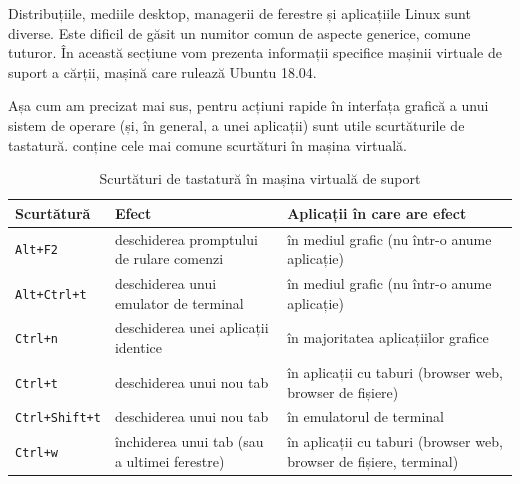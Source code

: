 Distribuțiile, mediile desktop, managerii de ferestre și aplicațiile Linux sunt diverse. Este dificil de găsit un numitor comun de aspecte generice, comune tuturor. În această secțiune vom prezenta informații specifice mașinii virtuale de suport a cărții, mașină care rulează Ubuntu 18.04.

Așa cum am precizat mai sus, pentru acțiuni rapide în interfața grafică a unui sistem de operare (și, în general, a unei aplicații) sunt utile scurtăturile de tastatură.  conține cele mai comune scurtături în mașina virtuală.

\begin{table}[!htb]
  \caption{Scurtături de tastatură în mașina virtuală de suport}
  {\scriptsize
  \begin{center}
    \begin{tabular}{ p{} p{} p{} }
      \toprule
        \textbf{Scurtătură} &
        \textbf{Efect} &
        \textbf{Aplicații în care are efect} \\
      \midrule
        \texttt{Alt+F2} &
        deschiderea promptului de rulare comenzi &
        în mediul grafic (nu într-o anume aplicație) \\
        \midrule

        \texttt{Alt+Ctrl+t} &
        deschiderea unui emulator de terminal &
        în mediul grafic (nu într-o anume aplicație) \\
        \midrule

        \texttt{Ctrl+n} &
        deschiderea unei aplicații identice &
        în majoritatea aplicațiilor grafice \\
        \midrule

        \texttt{Ctrl+t} &
        deschiderea unui nou tab &
        în aplicații cu taburi (browser web, browser de fișiere) \\
        \midrule

        \texttt{Ctrl+Shift+t} &
        deschiderea unui nou tab &
        în emulatorul de terminal \\
        \midrule

        \texttt{Ctrl+w} &
        închiderea unui tab (sau a ultimei ferestre) &
        în aplicații cu taburi (browser web, browser de fișiere, terminal) \\
        \midrule


\end{tabular}
\end{center}}
\end{table}

